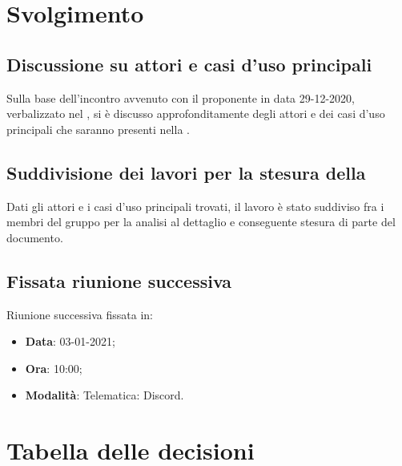 \documentclass[]{article}
\begin{document}
	\newpage

	\section{Svolgimento}
		\subsection{Discussione su attori e casi d'uso principali}
        Sulla base dell'incontro avvenuto con il proponente in data 29-12-2020, verbalizzato nel , si è discusso approfonditamente degli attori e dei casi d'uso principali che saranno presenti nella .

        \subsection{Suddivisione dei lavori per la stesura della }
        Dati gli attori e i casi d'uso principali trovati, il lavoro è stato suddiviso fra i membri del gruppo per la analisi al dettaglio e conseguente stesura di parte del documento.

		\subsection{Fissata riunione successiva}
		Riunione successiva fissata in:
		\begin{itemize}
			\item \textbf{Data}: 03-01-2021;
			\item \textbf{Ora}: 10:00;
			\item \textbf{Modalità}: Telematica: Discord.
		\end{itemize}

	\newpage

	\section{Tabella delle decisioni}
\end{document}
